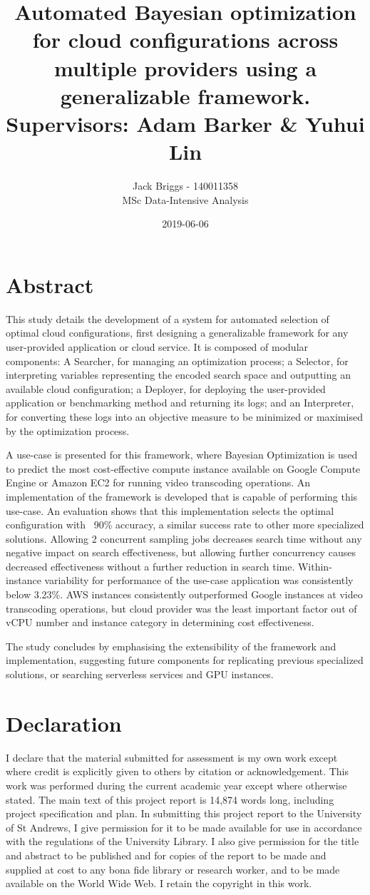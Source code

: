 \documentclass{report}
\title{\vspace{-2.0cm} Automated Bayesian optimization for cloud configurations across multiple providers using a generalizable framework. \\ \vspace{0.5cm} \large Supervisors: Adam Barker \& Yuhui Lin}
\date{2019-06-06}
\author{Jack Briggs - 140011358 \\ MSc Data-Intensive Analysis}
\begin{document}
\maketitle
\newpage
\chapter*{Abstract}
This study details the development of a system for automated selection of optimal cloud configurations, first designing a generalizable framework for any user-provided application or cloud service. It is composed of modular components: A Searcher, for managing an optimization process; a Selector, for interpreting variables representing the encoded search space and outputting an available cloud configuration; a Deployer, for deploying the user-provided application or benchmarking method and returning its logs; and an Interpreter, for converting these logs into an objective measure to be minimized or maximised by the optimization process. 

A use-case is presented for this framework, where Bayesian Optimization is used to predict the most cost-effective compute instance available on Google Compute Engine or Amazon EC2 for running video transcoding operations. An implementation of the framework is developed that is capable of performing this use-case. An evaluation shows that this implementation selects the optimal configuration with ~90\% accuracy, a similar success rate to other more specialized solutions. Allowing 2 concurrent sampling jobs decreases search time without any negative impact on search effectiveness, but allowing further concurrency causes decreased effectiveness without a further reduction in search time. Within-instance variability for performance of the use-case application was consistently below 3.23\%. AWS instances consistently outperformed Google instances at video transcoding operations, but cloud provider was the least important factor out of vCPU number and instance category in determining cost effectiveness.

The study concludes by emphasising the extensibility of the framework and implementation, suggesting future components for replicating previous specialized solutions, or searching serverless services and GPU instances.
\newpage
\chapter*{Declaration}
I declare that the material submitted for assessment
is my own work except where credit is explicitly
given to others by citation or acknowledgement. This
work was performed during the current academic year
except where otherwise stated.
The main text of this project report is 14,874 words
long, including project specification and plan.
In submitting this project report to the University of St
Andrews, I give permission for it to be made
available for use in accordance with the regulations of the University Library. I also give permission for the title and abstract to be published and for copies of the report to be made and supplied at cost to any bona fide library or research worker, and to be made available on the World Wide Web. I retain the copyright in this work.
\newpage
\tableofcontents
\listoffigures
\newpage
{}
\end{document}
